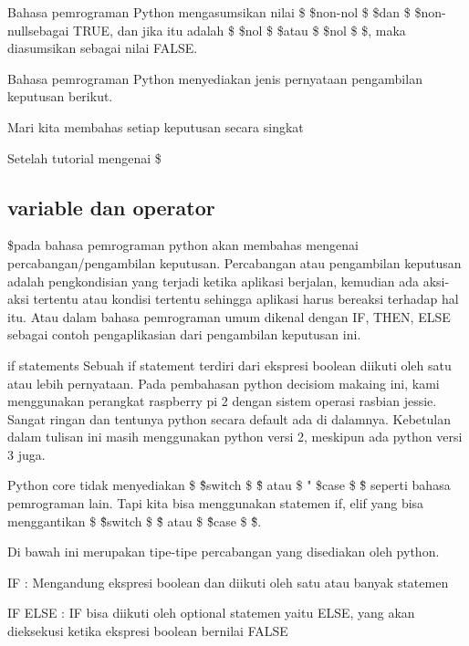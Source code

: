 Bahasa pemrograman Python mengasumsikan nilai \$  \$non-nol \$  \$dan \$  \$non-nullsebagai TRUE, dan jika itu adalah \$  \$nol \$  \$atau \$  \$nol \$  \$, maka diasumsikan sebagai nilai FALSE. \par
Bahasa pemrograman Python menyediakan jenis pernyataan pengambilan keputusan berikut. \par
\vspace{12pt}
\noindent 
Mari kita membahas setiap keputusan secara singkat  \par
\vspace{12pt}
\noindent 
Setelah tutorial mengenai \$ 
\subsection{variable dan operator}
\$pada bahasa pemrograman python akan membahas mengenai percabangan/pengambilan keputusan. Percabangan atau pengambilan keputusan adalah pengkondisian yang terjadi ketika aplikasi berjalan, kemudian ada aksi-aksi tertentu atau kondisi tertentu sehingga aplikasi harus bereaksi terhadap hal itu. Atau dalam bahasa pemrograman umum dikenal dengan IF, THEN, ELSE sebagai contoh pengaplikasian dari pengambilan keputusan ini. \par
\vspace{12pt}
if statements
Sebuah if statement terdiri dari ekspresi boolean diikuti oleh satu atau lebih pernyataan.
\noindent 
Pada pembahasan python decisiom makaing ini, kami menggunakan perangkat raspberry pi 2 dengan sistem operasi rasbian jessie. Sangat ringan dan tentunya python secara default ada di dalamnya. Kebetulan dalam tulisan ini masih menggunakan python versi 2, meskipun ada python versi 3 juga. \par
\vspace{12pt}
\noindent 
Python core tidak menyediakan  \$ \" \$switch \$ \" \$ atau  \$ " \$case \$ \" \$ seperti bahasa pemrograman lain. Tapi kita bisa menggunakan statemen if, elif yang bisa menggantikan  \$ \" \$switch \$ \" \$ atau  \$ \" \$case \$ \" \$. \par
\vspace{12pt}
\noindent 
Di bawah ini merupakan tipe-tipe percabangan yang disediakan oleh python. \par
\vspace{12pt}
\noindent 
IF : Mengandung ekspresi boolean dan diikuti oleh satu atau banyak statemen \par
\vspace{12pt}
\noindent 
IF ELSE : IF bisa diikuti oleh optional statemen yaitu ELSE, yang akan dieksekusi ketika ekspresi boolean bernilai FALSE \par
